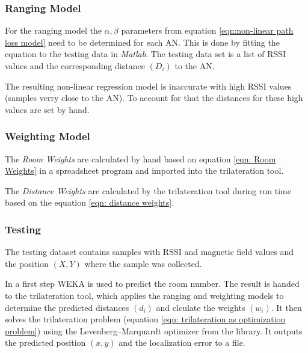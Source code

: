 \subsubsection*{Ranging Model}
For the ranging model the \(\alpha, \beta\) parameters from equation \ref{eqn:non-linear path loss model} need to be determined for each AN. This is done by fitting the equation to the testing data in \emph{Matlab}. The testing data set is a list of RSSI values and the corresponding distance \((D_{i})\) to the AN.

The resulting non-linear regression model is inaccurate with high RSSI values (samples verry close to the AN). To account for that the distances for these high values are set by hand.

\subsubsection*{Weighting Model}

The \emph{Room Weights} are calculated by hand based on equation \ref{eqn: Room Weights} in a spreadsheet program and imported into the trilateration tool.

The \emph{Distance Weights} are calculated by the trilateration tool during run time based on the equation \ref{eqn: distance weights}.

\subsubsection*{Testing}

The testing dataset contains samples with RSSI and magnetic field values and the position \((X,Y)\) where the sample was collected.

In a first step WEKA is used to predict the room number. The result is handed to the trilateration tool, which applies the ranging and weighting models to determine the predicted distances \((d_{i})\) and clculate the weights \((w_{i})\). It then solves the trilateration problem (equation \ref{eqn: trilateration as optimization problem}) using the Levenberg–Marquardt optimizer from the  library. It outputs the predicted position \((x,y)\) and the localization error to a  file.